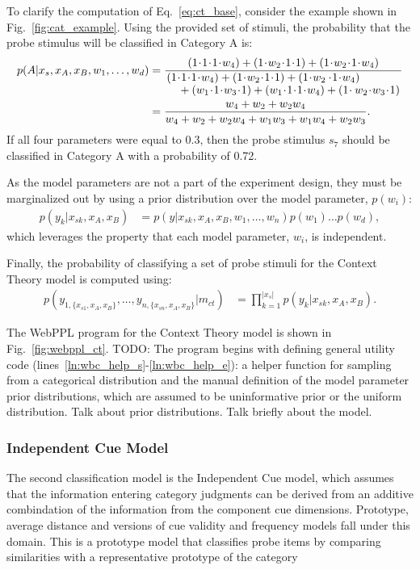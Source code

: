 \documentclass{article}
\begin{document}
To clarify the computation of Eq.~\ref{eq:ct_base}, consider the example shown in Fig.~\ref{fig:cat_example}. Using the provided set of stimuli, the probability that the probe stimulus will be classified in Category A is: 
\begin{align}
    p(A | x_s, x_A, x_B, w_1, \dots, w_d) 
        &= \frac{(1\!\cdot\!1\!\cdot\!1\!\cdot\!w_4) + (1\!\cdot\!w_2\!\cdot\!1\!\cdot\!1) + (1\!\cdot\!w_2\!\cdot\!1\!\cdot\!w_4)}{ \splitfrac{(1\!\cdot\!1\!\cdot\!1\!\cdot\!w_4) + (1\!\cdot\!w_2\!\cdot\!1\!\cdot\!1) + (1\!\cdot\!w_2 \cdot\!1\!\cdot\!w_4)}{+ (w_1\!\cdot\!1\!\cdot\!w_3\!\cdot\!1) + (w_1\!\cdot\!1\!\cdot\!1\!\cdot\!w_4) + (1\!\cdot w_2\!\cdot\!w_3\!\cdot\!1)}} \notag \\
        &= \frac{w_4 + w_2 + w_2w_4}{w_4 + w_2 + w_2w_4 + w_1w_3 + w_1w_4 + w_2w_3}. 
\end{align}
If all four parameters were equal to 0.3, then the probe stimulus $s_7$ should be classified in Category A with a probability of 0.72. 

As the model parameters are not a part of the experiment design, they must be marginalized out by using a prior distribution over the model parameter, $p(w_i)$:
\begin{align}
    p(y_k | x_{sk}, x_A, x_B) &=  p(y|x_{sk}, x_A, x_B ,w_1, \dots, w_n) p(w_1) \dots p(w_d),
\end{align}
which leverages the property that each model parameter, $w_i$, is independent.

Finally, the probability of classifying a set of probe stimuli for the Context Theory model is computed using: 
\begin{align}
    p(y_{1,\{x_{s1}, x_A, x_B\}}, \dots, y_{n,\{x_{sn}, x_A, x_B\}} | m_{ct}) &=  \prod\limits_{k=1}^{|x_s|} p(y_k|x_{sk}, x_A, x_B).
\end{align}

The WebPPL program for the Context Theory model is shown in Fig.~\ref{fig:webppl_ct}. TODO: The program begins with defining general utility code (lines~\ref{ln:wbc_help_s}-\ref{ln:wbc_help_e}): a helper function for sampling from a categorical distribution and the manual definition of the model parameter prior distributions, which are assumed to be uninformative prior or the uniform distribution. Talk about prior distributions. Talk briefly about the model. 


\subsubsection{Independent Cue Model}
The second classification model is the Independent Cue model, which assumes that the information entering category judgments can be derived from an additive combindation of the information from the component cue dimensions. Prototype, average distance and versions of cue validity and frequency models fall under this domain. This is a prototype model that classifies probe items by comparing similarities with a representative prototype of the category
\end{document}
